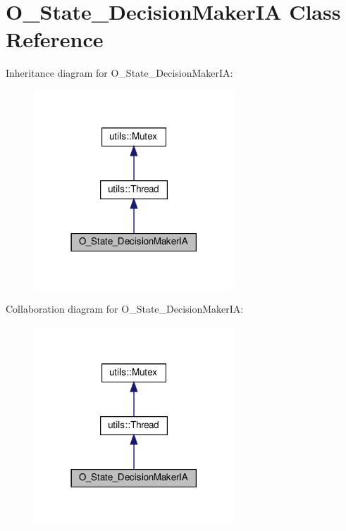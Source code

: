 \hypertarget{classO__State__DecisionMakerIA}{}\section{O\+\_\+\+State\+\_\+\+Decision\+Maker\+IA Class Reference}
\label{classO__State__DecisionMakerIA}


Inheritance diagram for O\+\_\+\+State\+\_\+\+Decision\+Maker\+IA\+:
\nopagebreak
\begin{figure}[H]
\begin{center}
\leavevmode
\includegraphics[width=213pt]{classO__State__DecisionMakerIA__inherit__graph}
\end{center}
\end{figure}


Collaboration diagram for O\+\_\+\+State\+\_\+\+Decision\+Maker\+IA\+:
\nopagebreak
\begin{figure}[H]
\begin{center}
\leavevmode
\includegraphics[width=213pt]{classO__State__DecisionMakerIA__coll__graph}
\end{center}
\end{figure}
